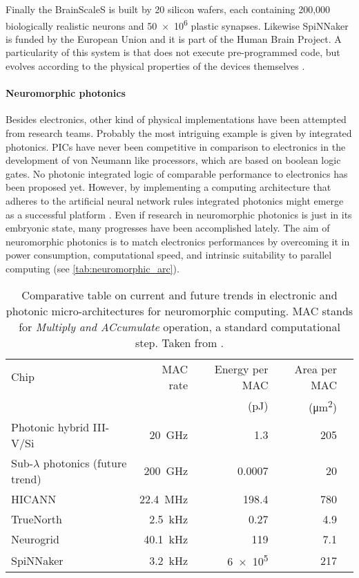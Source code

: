 Finally the BrainScaleS is built by 20 silicon wafers, each containing  200,000 biologically realistic neurons and \num{50e6} plastic synapses.
Likewise SpiNNaker is funded by the European Union and it is part of the Human Brain Project.
A particularity of this system is that does not execute pre-programmed code, but evolves according to the physical properties of the devices themselves \cite{HBP.eu}.

\paragraph{Neuromorphic photonics\\}
Besides electronics, other kind of physical implementations have been attempted from research teams.
Probably the most intriguing example is given by integrated photonics.
\acp{PIC} have never been competitive in comparison to electronics in the development of von Neumann like processors, which are based on boolean logic gates.
No photonic integrated logic of comparable performance to electronics has been proposed yet.
However, by implementing a computing architecture that adheres to the artificial neural network rules integrated photonics might emerge as a successful platform \cite{de2017progress}.
Even if research in neuromorphic photonics is just in its embryonic state, many progresses have been accomplished lately.
The aim of neuromorphic photonics is to match electronics performances by overcoming it in power consumption, computational speed, and intrinsic suitability to parallel computing (see \autoref{tab:neuromorphic_arc}).

\begin{table}[!htbp]
	\centering
	\footnotesize
	\begin{tabular}{l r r r r}
	\toprule
	\normalsize Chip & \normalsize \acs{MAC} rate &%
	\normalsize Energy per \acs{MAC} & \normalsize Area per \acs{MAC} \\
	& & (\si{\pico\joule}) & (\si{\square\um})\\
	\midrule
	Photonic hybrid III-V/Si & \SI{20}{\GHz} & \num{1.3} 	& 205 \\
	Sub-$\lambda$ photonics (future trend) & \SI{200}{\GHz} & \num{0.0007} 	& 20 \\
	HICANN & \SI{22.4}{\MHz} & \num{198.4} 	& 780 \\
	TrueNorth & \SI{2.5}{\kHz} & \num{0.27} 	& 4.9 \\
	Neurogrid & \SI{40.1}{\kHz} & \num{119} 	& 7.1 \\
	SpiNNaker & \SI{3.2}{\kHz} & \num{6e5} 	& 217 \\
	\bottomrule
	\end{tabular}
	\caption{Comparative table on current and future trends in electronic and photonic micro-architectures for neuromorphic computing. \acs{MAC} stands for \textit{Multiply and ACcumulate} operation, a standard computational step. Taken from \cite{de2017progress}.}
	\label{tab:neuromorphic_arc}
\end{table}


